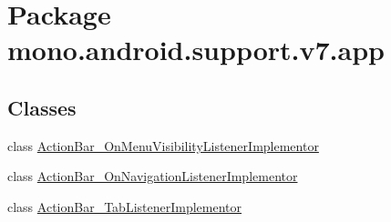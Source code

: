 \hypertarget{namespacemono_1_1android_1_1support_1_1v7_1_1app}{
\section{Package mono.android.support.v7.app}
\label{namespacemono_1_1android_1_1support_1_1v7_1_1app}
}
\subsection*{Classes}
\begin{CompactItemize}
\item 
class \hyperlink{classmono_1_1android_1_1support_1_1v7_1_1app_1_1_action_bar___on_menu_visibility_listener_implementor}{ActionBar\_\-OnMenuVisibilityListenerImplementor}
\item 
class \hyperlink{classmono_1_1android_1_1support_1_1v7_1_1app_1_1_action_bar___on_navigation_listener_implementor}{ActionBar\_\-OnNavigationListenerImplementor}
\item 
class \hyperlink{classmono_1_1android_1_1support_1_1v7_1_1app_1_1_action_bar___tab_listener_implementor}{ActionBar\_\-TabListenerImplementor}
\end{CompactItemize}
